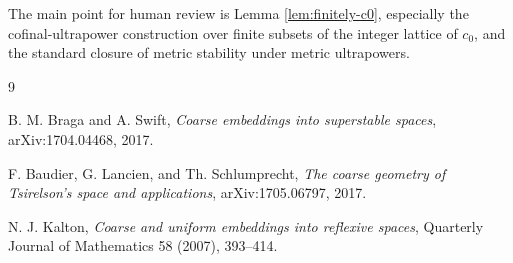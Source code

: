 \documentclass[11pt]{article}
\begin{document}
The main point for human review is Lemma \ref{lem:finitely-c0}, especially the
cofinal-ultrapower construction over finite subsets of the integer lattice of
\(c_0\), and the standard closure of metric stability under metric ultrapowers.

\begin{thebibliography}{9}

B. M. Braga and A. Swift,
\emph{Coarse embeddings into superstable spaces},
arXiv:1704.04468, 2017.

F. Baudier, G. Lancien, and Th. Schlumprecht,
\emph{The coarse geometry of Tsirelson's space and applications},
arXiv:1705.06797, 2017.

N. J. Kalton,
\emph{Coarse and uniform embeddings into reflexive spaces},
Quarterly Journal of Mathematics 58 (2007), 393--414.

\end{thebibliography}
\end{document}
